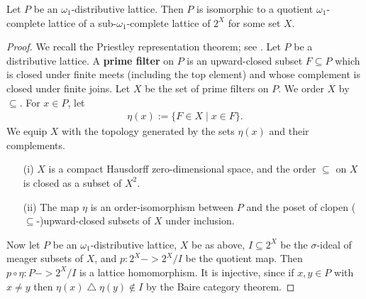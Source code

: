 \documentclass[11pt]{article}
\newcommand*\defn{\textbf}
\begin{document}
\begin{theorem}
\label{thm:sdlat}
Let $P$ be an $\omega_1$-distributive lattice.  Then $P$ is isomorphic to a quotient $\omega_1$-complete lattice of a sub-$\omega_1$-complete lattice of $2^X$ for some set $X$.
\end{theorem}
\begin{proof}
We recall the Priestley representation theorem; see \cite[II~4.5--8, VII~1.1]{Joh}.  Let $P$ be a distributive lattice.  A \defn{prime filter} on $P$ is an upward-closed subset $F \subseteq P$ which is closed under finite meets (including the top element) and whose complement is closed under finite joins.  Let $X$ be the set of prime filters on $P$.  We order $X$ by $\subseteq$.  For $x \in P$, let
\begin{align*}
\eta(x) := \{F \in X \mid x \in F\}.
\end{align*}
We equip $X$ with the topology generated by the sets $\eta(x)$ and their complements.
\begin{theorem}[Priestley]
\begin{enumerate}
\item[(i)]  $X$ is a compact Hausdorff zero-dimensional space, and the order $\subseteq$ on $X$ is closed as a subset of $X^2$.
\item[(ii)]  The map $\eta$ is an order-isomorphism between $P$ and the poset of clopen ($\subseteq$-)upward-closed subsets of $X$ under inclusion.
\end{enumerate}
\end{theorem}

Now let $P$ be an $\omega_1$-distributive lattice, $X$ be as above, $I \subseteq 2^X$ be the $\sigma$-ideal of meager subsets of $X$, and $p : 2^X -> 2^X/I$ be the quotient map.  Then $p \circ \eta : P -> 2^X/I$ is a lattice homomorphism.  It is injective, since if $x, y \in P$ with $x \ne y$ then $\eta(x) \mathbin{\triangle} \eta(y) \not\in I$ by the Baire category theorem.


\end{proof}
\end{document}

